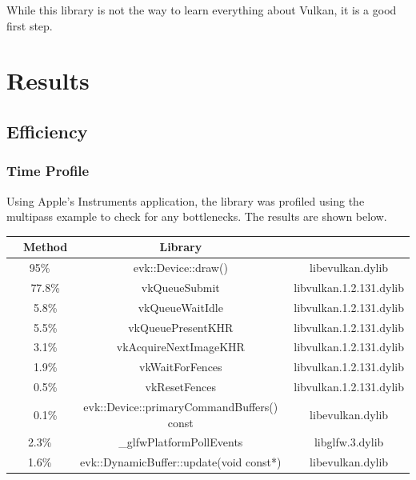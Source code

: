 \documentclass[12pt]{report}
\newcommand{\bgcell}{\cellcolor{lightgray}}
\theoremstyle{definition}
\begin{document}
        While this library is not the way to learn everything about Vulkan, it
        is a good first step.

  \chapter{Results}

    \section{Efficiency}

      \subsection{Time Profile}

        Using Apple's Instruments application, the library was profiled using
        the multipass example to check for any bottlenecks. The results are
        shown below.

        \begin{center}
          \begin{tabular}{ |c c|c|c| } 
            \hline
            \rowcolor{lightgray}\multicolumn{2}{|c|}{\%Time} & Method & Library \\
            \hline
            \multicolumn{2}{|c|}{95\%} & evk::Device::draw() & libevulkan.dylib \\
            \bgcell & 77.8\% & vkQueueSubmit & libvulkan.1.2.131.dylib \\
            \bgcell & 5.8\% & vkQueueWaitIdle & libvulkan.1.2.131.dylib \\
            \bgcell & 5.5\% & vkQueuePresentKHR & libvulkan.1.2.131.dylib \\
            \bgcell & 3.1\% & vkAcquireNextImageKHR & libvulkan.1.2.131.dylib \\
            \bgcell & 1.9\% & vkWaitForFences & libvulkan.1.2.131.dylib \\
            \bgcell & 0.5\% & vkResetFences & libvulkan.1.2.131.dylib \\
            \bgcell & 0.1\% & evk::Device::primaryCommandBuffers() const & libevulkan.dylib \\
            \multicolumn{2}{|c|}{2.3\%} & \_glfwPlatformPollEvents & libglfw.3.dylib \\
            \multicolumn{2}{|c|}{1.6\%} & evk::DynamicBuffer::update(void const*) & libevulkan.dylib \\
            \hline
          \end{tabular}
        \end{center}
\end{document}
